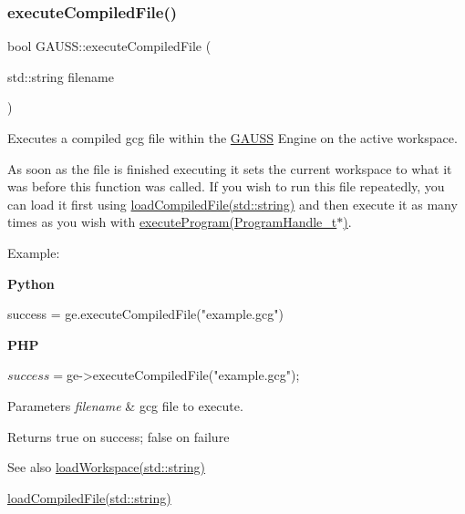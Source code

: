 \subsubsection{\texorpdfstring{execute\+Compiled\+File()}{executeCompiledFile()}\hspace{0.1cm}{\footnotesize\ttfamily [1/2]}}
{\footnotesize\ttfamily bool G\+A\+U\+S\+S\+::execute\+Compiled\+File (\begin{DoxyParamCaption}\item[{std\+::string}]{filename }\end{DoxyParamCaption})}



Executes a compiled gcg file within the \hyperlink{class_g_a_u_s_s}{G\+A\+U\+SS} Engine on the active workspace. 

As soon as the file is finished executing it sets the current workspace to what it was before this function was called. If you wish to run this file repeatedly, you can load it first using \hyperlink{class_g_a_u_s_s_a664d80b6f169ea22867b4a949d2fbc93}{load\+Compiled\+File(std\+::string)} and then execute it as many times as you wish with \hyperlink{class_g_a_u_s_s_a7fc9de69421c14aadb9a6310fecabcca}{execute\+Program(\+Program\+Handle\+\_\+t$\ast$)}.

Example\+:

{\bfseries Python} 
\begin{DoxyCode}
success = ge.executeCompiledFile(\textcolor{stringliteral}{"example.gcg"})
\end{DoxyCode}


{\bfseries P\+HP} 
\begin{DoxyCode}
$success = $ge->executeCompiledFile(\textcolor{stringliteral}{"example.gcg"});
\end{DoxyCode}



\begin{DoxyParams}{Parameters}
{\em filename} & gcg file to execute. \\
\hline
\end{DoxyParams}
\begin{DoxyReturn}{Returns}
true on success; false on failure
\end{DoxyReturn}
\begin{DoxySeeAlso}{See also}
\hyperlink{class_g_a_u_s_s_a7735659dac094c3af6c438011afb2a77}{load\+Workspace(std\+::string)} 

\hyperlink{class_g_a_u_s_s_a664d80b6f169ea22867b4a949d2fbc93}{load\+Compiled\+File(std\+::string)} 
\end{DoxySeeAlso}
\mbox{\label{class_g_a_u_s_s_a910fde00b8ff18303cae28aec3fbc447}} 
